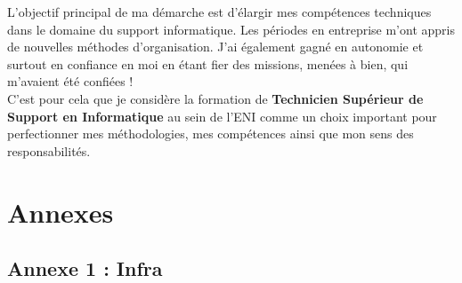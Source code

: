 \documentclass[11pt,a4paper,oneside]{article}
\begin{document}
L’objectif principal de ma démarche est d’élargir mes compétences techniques dans le domaine du support informatique. Les périodes en entreprise m’ont appris de nouvelles méthodes d’organisation. J’ai également gagné en autonomie et surtout en confiance en moi en étant fier des missions, menées à bien, qui m’avaient été confiées ! \\

C’est pour cela que je considère la formation de \textbf{Technicien Supérieur de Support en Informatique} au sein de l’ENI comme un choix important pour perfectionner mes méthodologies, mes compétences ainsi que mon sens des responsabilités.
\newpage

\section*{Annexes}
\label{sec:Annexes}
\subsection*{Annexe 1 : Infra}
\end{document}
